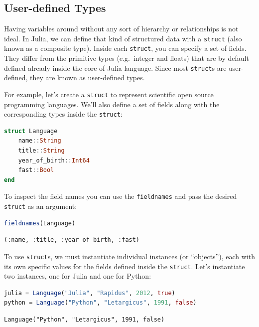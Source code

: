 \documentclass[
  notoc %
]{tufte-book}
\newcommand{\passthrough}[1]{#1}
\begin{document}
\hypertarget{sec:struct}{%
\subsection{User-defined Types}\label{sec:struct}}

Having variables around without any sort of hierarchy or relationships
is not ideal. In Julia, we can define that kind of structured data with
a \passthrough{\lstinline!struct!} (also known as a composite type).
Inside each \passthrough{\lstinline!struct!}, you can specify a set of
fields. They differ from the primitive types (e.g.~integer and floats)
that are by default defined already inside the core of Julia language.
Since most \passthrough{\lstinline!struct!}s are user-defined, they are
known as user-defined types.

For example, let's create a \passthrough{\lstinline!struct!} to
represent scientific open source programming languages. We'll also
define a set of fields along with the corresponding types inside the
\passthrough{\lstinline!struct!}:

\begin{lstlisting}[language=Julia]
struct Language
    name::String
    title::String
    year_of_birth::Int64
    fast::Bool
end
\end{lstlisting}

To inspect the field names you can use the
\passthrough{\lstinline!fieldnames!} and pass the desired
\passthrough{\lstinline!struct!} as an argument:

\begin{lstlisting}[language=Julia]
fieldnames(Language)
\end{lstlisting}

\begin{lstlisting}[language=Output]
(:name, :title, :year_of_birth, :fast)
\end{lstlisting}

To use \passthrough{\lstinline!struct!}s, we must instantiate individual
instances (or ``objects''), each with its own specific values for the
fields defined inside the \passthrough{\lstinline!struct!}. Let's
instantiate two instances, one for Julia and one for Python:

\begin{lstlisting}[language=Julia]
julia = Language("Julia", "Rapidus", 2012, true)
python = Language("Python", "Letargicus", 1991, false)
\end{lstlisting}

\begin{lstlisting}[language=Output]
Language("Python", "Letargicus", 1991, false)
\end{lstlisting}
\end{document}
